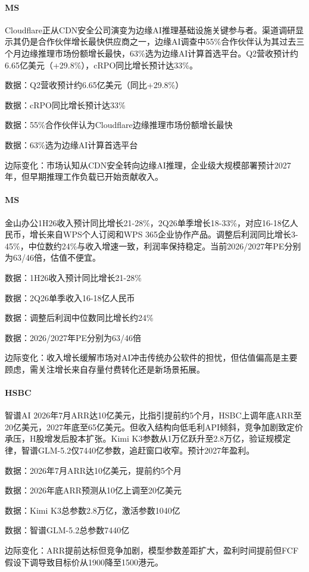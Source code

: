 \documentclass[11pt]{ctexart}
\begin{document}
\paragraph{MS} Cloudflare正从CDN安全公司演变为边缘AI推理基础设施关键参与者。渠道调研显示其仍是合作伙伴增长最快供应商之一，边缘AI调查中55\%合作伙伴认为其过去三个月边缘推理市场份额增长最快，63\%选为边缘AI计算首选平台。Q2营收预计约6.65亿美元（+29.8\%），cRPO同比增长预计达33\%。
{\small\color{refgray}数据：Q2营收预计约6.65亿美元（同比+29.8\%）\par}
{\small\color{refgray}数据：cRPO同比增长预计达33\%\par}
{\small\color{refgray}数据：55\%合作伙伴认为Cloudflare边缘推理市场份额增长最快\par}
{\small\color{refgray}数据：63\%选为边缘AI计算首选平台\par}
{\small\color{refgray}边际变化：市场认知从CDN安全转向边缘AI推理，企业级大规模部署预计2027年，但早期推理工作负载已开始贡献收入。\par}
\paragraph{MS} 金山办公1H26收入预计同比增长21-28\%，2Q26单季增长18-33\%，对应16-18亿人民币，增长来自WPS个人订阅和WPS 365企业协作产品。调整后利润同比增长3-45\%，中位数约24\%与收入增速一致，利润率保持稳定。当前2026/2027年PE分别为63/46倍，估值不便宜。
{\small\color{refgray}数据：1H26收入预计同比增长21-28\%\par}
{\small\color{refgray}数据：2Q26单季收入16-18亿人民币\par}
{\small\color{refgray}数据：调整后利润中位数同比增长约24\%\par}
{\small\color{refgray}数据：2026/2027年PE分别为63/46倍\par}
{\small\color{refgray}边际变化：收入增长缓解市场对AI冲击传统办公软件的担忧，但估值偏高是主要顾虑，需关注增长来自存量付费转化还是新场景拓展。\par}
\paragraph{HSBC} 智谱AI 2026年7月ARR达10亿美元，比指引提前约5个月，HSBC上调年底ARR至20亿美元，2027年底至65亿美元。但收入结构向低毛利API倾斜，竞争加剧致定价承压，H股增发后股本扩张。Kimi K3参数从1万亿跃升至2.8万亿，验证规模定律，智谱GLM-5.2仅7440亿参数，追赶窗口收窄。预计2027年盈利。
{\small\color{refgray}数据：2026年7月ARR达10亿美元，提前约5个月\par}
{\small\color{refgray}数据：2026年底ARR预测从10亿上调至20亿美元\par}
{\small\color{refgray}数据：Kimi K3总参数2.8万亿，激活参数1040亿\par}
{\small\color{refgray}数据：智谱GLM-5.2总参数7440亿\par}
{\small\color{refgray}边际变化：ARR提前达标但竞争加剧，模型参数差距扩大，盈利时间提前但FCF假设下调导致目标价从1900降至1500港元。\par}
\end{document}
